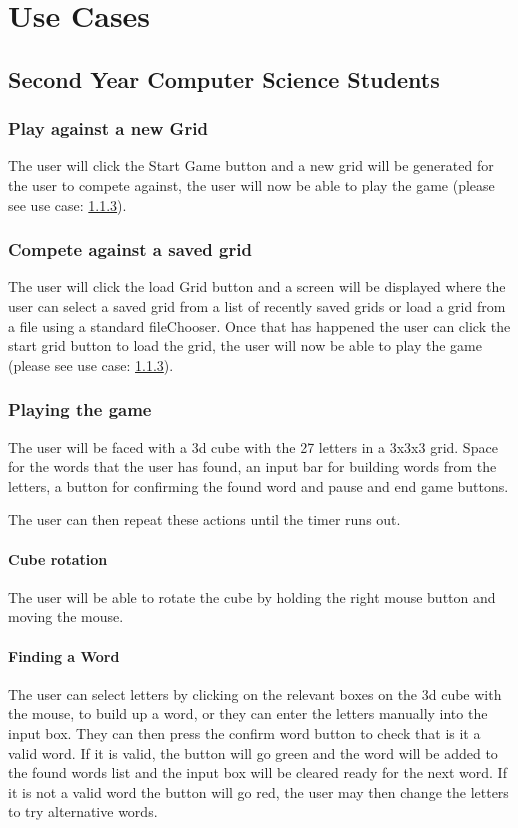 \documentclass{project}
\begin{document}
	
	

\section{Use Cases}
	\subsection{Second Year Computer Science Students}
		\subsubsection{Play against a new Grid}
			The user will click the Start Game button and a new grid will be generated for 	the user to compete against, the user will now be able to play the game (please see use case: \ref{Playing the game}).
		\subsubsection{Compete against a saved grid}
			The user will click the load Grid button and a screen will be displayed where the user can select a saved grid from a list of recently saved grids or load a grid from a file using a standard fileChooser. Once that has happened the user can click the start grid button to load the grid, the user will now be able to play the game (please see use case: \ref{Playing the game}).
		\subsubsection{Playing the game} \label{Playing the game}
			The user will be faced with a 3d cube with the 27 letters in a 3x3x3 grid. Space for the words that the user has found, an input bar for building words from the letters, a button for confirming the found word and pause and end game buttons. 
			
			The user can then repeat these actions until the timer runs out.
			
			\paragraph{Cube rotation}
			The user will be able to rotate the cube by holding the right mouse button and moving the mouse.
			\paragraph{Finding a Word}
			The user can select letters by clicking on the relevant boxes on the 3d cube with the mouse, to build up a word, or they can enter the letters manually into the input box. They can then press the confirm word button to check that is it a valid word. If it is valid, the button will go green and the word will be added to the found words list and the input box will be cleared ready for the next word. If it is not a valid word the button will go red, the user may then change the letters to try alternative words.
		
\end{document}
